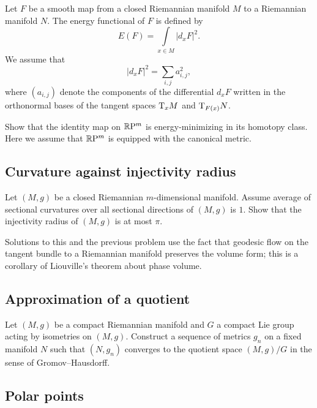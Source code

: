 Let $F$ be a smooth map from a closed Riemannian manifold $M$ to a Riemannian manifold $N$.
The energy functional of $F$ is defined by
\[E(F)=\int\limits_{x\in M} |d_xF|^2.\]
We assume that  
\[|d_xF|^2=\sum_{i,j}a_{i,j}^2,\]
where $(a_{i,j})$ denote the components 
of the differential $d_xF$ 
written in the orthonormal bases of the tangent spaces $\mathrm{T}_xM$ and $\mathrm{T}_{F(x)}N$.

\begin{pr}
Show that the identity map on $\mathbb{R}\mathrm{P}^m$ is 
energy-minimizing in its homotopy class.
Here we assume that $\mathbb{R}\mathrm{P}^m$ is equipped with the canonical metric.
\end{pr}


\subsection*{Curvature against injectivity radius\thm}
\label{scalar-curv}

\begin{pr} 
Let $(M,g)$ be a closed 
Riemannian $m$-dimensional manifold.
Assume average of sectional curvatures over all sectional directions of $(M,g)$ is $1$. 
Show that the injectivity radius of $(M,g)$ is at most $\pi$.
\end{pr}

Solutions to this and the previous problem use the fact that geodesic flow on the tangent bundle to a Riemannian manifold preserves the volume form; this is a corollary of Liouville's theorem about phase volume.

\subsection*{Approximation of a quotient}

\begin{pr}
Let $(M,g)$ be a compact Riemannian manifold 
and $G$ a compact Lie group acting by isometries on $(M,g)$.
Construct a sequence of metrics $g_n$ on a fixed manifold $N$ such that $(N,g_n)$ converges to the quotient space $(M,g)/G$ in the sense of Gromov--Hausdorff.
\end{pr}


\subsection*{Polar points\many}
\label{milka-polar} 

